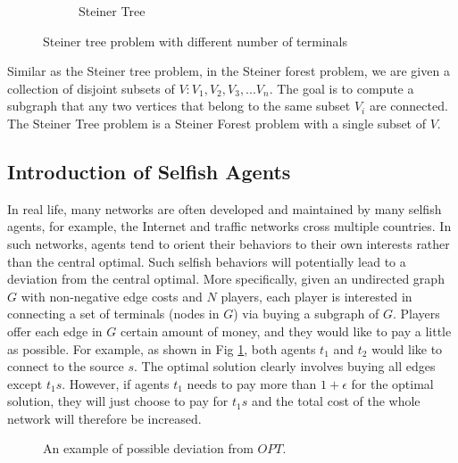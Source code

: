 \documentclass[11pt,psfig,times]{article}
\begin{document}
\begin{figure}[H]
\begin{center}
\begin{subfigure}[b]{0.25\textwidth}
			\caption{Steiner Tree}
		\end{subfigure}
		\caption{Steiner tree problem with different number of terminals}
	\end{center}
\end{figure}
Similar as the Steiner tree problem, in the Steiner forest problem, we are given a collection of disjoint subsets of \(V: V_1,V_2,V_3,...V_n\). The goal is to compute a subgraph that any two vertices that belong to the same subset \(V_i\) are connected. The Steiner Tree problem is a Steiner Forest problem with a single subset of \(V\).  

\subsection{Introduction of Selfish Agents}
In real life, many networks are often developed and maintained by many selfish agents, for example, the Internet and traffic networks cross multiple countries. In such networks, agents tend to orient their behaviors to their own interests rather than the central optimal. Such selfish behaviors will potentially lead to a deviation from the central optimal. More specifically, given an undirected graph \(G\) with non-negative edge costs and \(N\) players, each player is interested in connecting a set of terminals (nodes in \(G\)) via buying a subgraph of \(G\). Players offer each edge in \(G\) certain amount of money, and they would like to pay a little as possible. For example, as shown in Fig \ref{fig:deviation}, both agents $t_1$ and $t_2$ would like to connect to the source $s$. The optimal solution clearly involves buying all edges except $t_1s$. However, if agents $t_1$ needs to pay more than $1+\epsilon$ for the optimal solution, they will just choose to pay for $t_1s$ and the total cost of the whole network will therefore be increased.

\begin{figure}[H]
	\begin{center}
	\end{center}
	\caption{An example of possible deviation from $OPT$.}
	\label{fig:deviation}
\end{figure}
\end{document}
